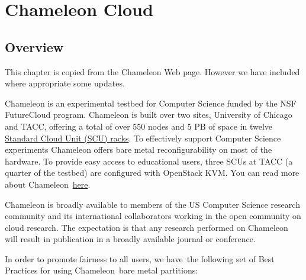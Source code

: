 
\chapter{Chameleon Cloud}


\section{Overview}
\label{C:chameleon}


\FILENAME

This chapter is copied from the Chameleon Web page. However we have
included where appropriate some updates. 

Chameleon is an experimental testbed for Computer Science funded by the
NSF FutureCloud program. Chameleon is built over two sites, University
of Chicago and TACC, offering a total of over 550 nodes and 5 PB of
space in twelve
\href{https://www.chameleoncloud.org/about/hardware-description/}{Standard
Cloud Unit (SCU) racks}. To effectively support Computer Science
experiments Chameleon offers bare metal reconfigurability on most of the
hardware. To provide easy access to educational users, three SCUs at
TACC (a quarter of the testbed) are configured with OpenStack KVM. You
can read more about
Chameleon~\href{https://www.chameleoncloud.org/about/chameleon/}{here}.

Chameleon is broadly available to members of the US Computer Science
research community and its international collaborators working in the
open community on cloud research. The expectation is that any research
performed on Chameleon will result in publication in a broadly
available journal or conference.

In order to promote fairness to all users, we have~the following set of
Best Practices for using Chameleon~bare metal partitions:

